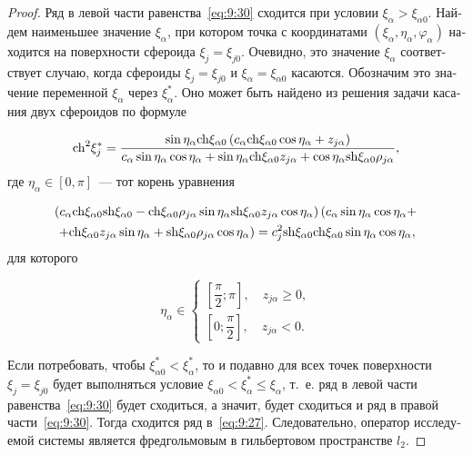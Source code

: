 \begin{russian}
\begin{proof}
Ряд в левой части равенства~\eqref{eq:9:30} сходится при условии $\xi_{\alpha}>\xi_{\alpha 0}$. Найдем наименьшее значение $\xi_{\alpha}$, при котором точка с координатами $\left( {{\xi _{\alpha}},{\eta _{\alpha}},{\varphi _{\alpha}}} \right)$ находится на поверхности сфероида $\xi_j=\xi_{j0}$. Очевидно, это значение $\xi_{\alpha}$ соответствует случаю, когда сфероиды $\xi_j=\xi_{j0}$ и $\xi_{\alpha}=\xi_{\alpha 0}$ касаются. Обозначим это значение переменной $\xi_{\alpha}$ через $\xi_{\alpha}^*$. Оно может быть найдено из решения задачи касания двух сфероидов по формуле

\begin{equation}
{{\mathop{\rm ch}\nolimits} ^2}\xi _j^* = \frac{{\sin {\eta _\alpha}{\mathop{\rm ch}\nolimits} {\xi _{\alpha 0}}\left( {{c_\alpha}{\mathop{\rm ch}\nolimits} {\xi _{\alpha 0}}\cos {\eta _\alpha} + {z_{j\alpha}}} \right)}}{{{c_\alpha}\sin {\eta _\alpha}\cos {\eta _\alpha} + \sin {\eta _\alpha}{\mathop{\rm ch}\nolimits} {\xi _{\alpha 0}}{z_{j\alpha}} + \cos {\eta _\alpha}{\mathop{\rm sh}\nolimits} {\xi _{\alpha 0}}{\rho _{j\alpha}}}},
\end{equation}
где $\eta_\alpha\in[0,\pi]$~--- тот корень уравнения

\begin{multline}
\left( {{c_\alpha}{\mathop{\rm ch}\nolimits} {\xi _{\alpha 0}}{\mathop{\rm sh}\nolimits} {\xi _{\alpha 0}} - {\mathop{\rm ch}\nolimits} {\xi _{\alpha 0}}{\rho _{j\alpha}}\sin {\eta _\alpha}{\mathop{\rm sh}\nolimits} {\xi _{\alpha 0}}{z_{j\alpha}}\cos {\eta _\alpha}} \right)\left( {{c_\alpha}\sin {\eta _\alpha}\cos {\eta _\alpha} + } \right.\\
\left. { + {\mathop{\rm ch}\nolimits} {\xi _{\alpha 0}}{z_{j\alpha}}\sin {\eta _\alpha} + {\mathop{\rm sh}\nolimits} {\xi _{\alpha 0}}{\rho _{j\alpha}}\cos {\eta _\alpha}} \right) = c_j^2{\mathop{\rm sh}\nolimits} {\xi _{\alpha 0}}{\mathop{\rm ch}\nolimits} {\xi _{\alpha 0}}\sin {\eta _\alpha}\cos {\eta _\alpha},
\end{multline}
для которого

\begin{equation}
{\eta _\alpha} \in \left\{ \begin{array}{l}
\left[ {\dfrac{\pi }{2};\pi } \right],\quad {z_{j\alpha}} \ge 0,\\
\left[ {0;\dfrac{\pi }{2}} \right],\quad {z_{j\alpha}} < 0.
\end{array} \right.
\end{equation}

Если потребовать, чтобы $\xi_{\alpha 0}^*<\xi_{\alpha}^*$, то и подавно для всех точек поверхности $\xi_j=\xi_{j0}$ будет выполняться условие $\xi_{\alpha 0}<\xi_{\alpha}^*\le\xi_{\alpha}$, т.~е. ряд в левой части равенства~\eqref{eq:9:30} будет сходиться, а значит, будет сходиться и ряд в правой части~\eqref{eq:9:30}. Тогда сходится ряд в~\eqref{eq:9:27}. Следовательно, оператор исследуемой системы является фредгольмовым в гильбертовом пространстве $l_2$.
\end{proof}


\end{russian}
